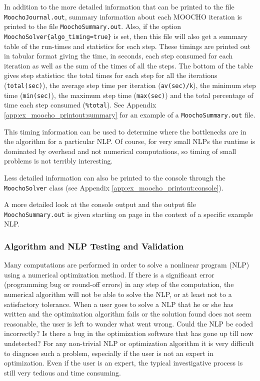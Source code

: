 \documentclass[pdf,ps2pdf,11pt]{SANDreport}
\begin{document}
In addition to the more detailed information that can be printed to the file
{}\texttt{Moocho\-Journal.out}, summary information about each MOOCHO
iteration is printed to the file {}\texttt{Moocho\-Summary.out}.  Also, if the
option {}\texttt{Moocho\-Solver\{\-algo\_timing\-=true\-\}} is set, then
this file will also get a summary table of the run-times and statistics for
each step.  These timings are printed out in tabular format giving the time,
in seconds, each step consumed for each iteration as well as the sum of the
times of all the steps.  The bottom of the table gives step statistics: the
total times for each step for all the iterations (\texttt{total(sec)}), the
average step time per iteration (\texttt{av(sec)/k}), the minimum step time
(\texttt{min(sec)}), the maximum step time (\texttt{max(sec)}) and the total
percentage of time each step consumed (\texttt{\%total}).  See Appendix
{}\ref{app:ex_moocho_printout:summary} for an example of a
{}\texttt{Moocho\-Summary.out} file.

This timing information can be used to determine where the bottlenecks are in
the algorithm for a particular NLP.  Of course, for very small NLPs the
runtime is dominated by overhead and not numerical computations, so timing of
small problems is not terribly interesting.

Less detailed information can also be printed to the console through the
{}\texttt{Moocho\-Solver} class (see Appendix
{}\ref{app:ex_moocho_printout:console}).

A more detailed look at the console output and the output file
{}\texttt{Moocho\-Summary.out} is given starting on page
{}\pageref{moocho:sec:detailed_example} in the context of a specific example
NLP.

%
\subsubsection{Algorithm and NLP Testing and Validation}
\label{moocho:sec:testing_and_validation}
%

Many computations are performed in order to solve a nonlinear program (NLP)
using a numerical optimization method.  If there is a significant error
(programming bug or round-off errors) in any step of the computation, the
numerical algorithm will not be able to solve the NLP, or at least not to a
satisfactory tolerance.  When a user goes to solve a NLP that he or she has
written and the optimization algorithm fails or the solution found does not
seem reasonable, the user is left to wonder what went wrong.  Could the NLP be
coded incorrectly?  Is there a bug in the optimization software that has gone
up till now undetected?  For any non-trivial NLP or optimization algorithm it
is very difficult to diagnose such a problem, especially if the user is not an
expert in optimization.  Even if the user is an expert, the typical
investigative process is still very tedious and time consuming.
\end{document}
